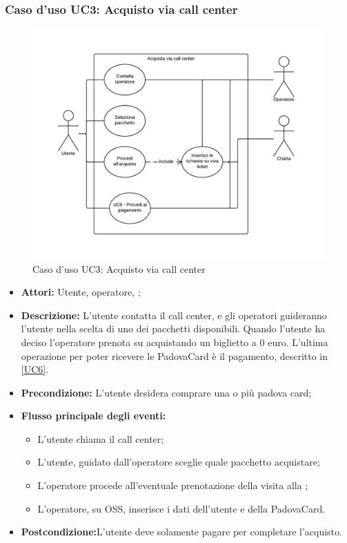\subsubsection{Caso d'uso UC3: Acquisto via call center}\label{UC3}
\begin{figure}[H]
\centering
\includegraphics[width=1\textwidth]{images/UC3.png}
\caption{Caso d'uso UC3: Acquisto via call center}
\end{figure}
\begin{itemize}
\item \textbf{Attori:} Utente, operatore, \charta;
\item \textbf{Descrizione:} L'utente contatta il call center, e gli operatori guideranno l'utente nella scelta di uno dei pacchetti disponibili. Quando l'utente ha deciso l'operatore prenota su \tlite acquistando un biglietto a 0 euro. L'ultima operazione per poter ricevere le PadovaCard è il pagamento, descritto in \ref{UC6}.
\item \textbf{Precondizione:} L'utente desidera comprare una o più padova card;
\item \textbf{Flusso principale degli eventi:}
	\begin{itemize}
		\item L'utente chiama il call center;
		\item L'utente, guidato dall'operatore sceglie quale pacchetto acquistare;
        \item L'operatore procede all'eventuale prenotazione della visita alla \cappella;
        \item L'operatore, su OSS, inserisce i dati dell'utente e della PadovaCard.
	\end{itemize}
\item \textbf{Postcondizione:}L'utente deve solamente pagare per completare l'acquisto.
\end{itemize}

